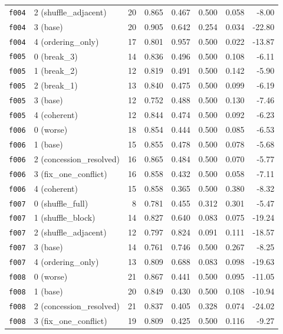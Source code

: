 \documentclass[11pt]{article}
\begin{document}
\begin{table}[htbp]
\begin{tabular}{llrrrrrr}
\texttt{f004} & 2 (shuffle\_adjacent) & 20 & 0.865 & 0.467 & 0.500 & 0.058 & -8.00 \\
\texttt{f004} & 3 (base) & 20 & 0.905 & 0.642 & 0.254 & 0.034 & -22.80 \\
\texttt{f004} & 4 (ordering\_only) & 17 & 0.801 & 0.957 & 0.500 & 0.022 & -13.87 \\
\midrule
\texttt{f005} & 0 (break\_3) & 14 & 0.836 & 0.496 & 0.500 & 0.108 & -6.11 \\
\texttt{f005} & 1 (break\_2) & 12 & 0.819 & 0.491 & 0.500 & 0.142 & -5.90 \\
\texttt{f005} & 2 (break\_1) & 13 & 0.840 & 0.475 & 0.500 & 0.099 & -6.19 \\
\texttt{f005} & 3 (base) & 12 & 0.752 & 0.488 & 0.500 & 0.130 & -7.46 \\
\texttt{f005} & 4 (coherent) & 12 & 0.844 & 0.474 & 0.500 & 0.092 & -6.23 \\
\midrule
\texttt{f006} & 0 (worse) & 18 & 0.854 & 0.444 & 0.500 & 0.085 & -6.53 \\
\texttt{f006} & 1 (base) & 15 & 0.855 & 0.478 & 0.500 & 0.078 & -5.68 \\
\texttt{f006} & 2 (concession\_resolved) & 16 & 0.865 & 0.484 & 0.500 & 0.070 & -5.77 \\
\texttt{f006} & 3 (fix\_one\_conflict) & 16 & 0.858 & 0.432 & 0.500 & 0.058 & -7.11 \\
\texttt{f006} & 4 (coherent) & 15 & 0.858 & 0.365 & 0.500 & 0.380 & -8.32 \\
\midrule
\texttt{f007} & 0 (shuffle\_full) & 8 & 0.781 & 0.455 & 0.312 & 0.301 & -5.47 \\
\texttt{f007} & 1 (shuffle\_block) & 14 & 0.827 & 0.640 & 0.083 & 0.075 & -19.24 \\
\texttt{f007} & 2 (shuffle\_adjacent) & 12 & 0.797 & 0.824 & 0.091 & 0.111 & -18.57 \\
\texttt{f007} & 3 (base) & 14 & 0.761 & 0.746 & 0.500 & 0.267 & -8.25 \\
\texttt{f007} & 4 (ordering\_only) & 13 & 0.809 & 0.688 & 0.083 & 0.098 & -19.63 \\
\midrule
\texttt{f008} & 0 (worse) & 21 & 0.867 & 0.441 & 0.500 & 0.095 & -11.05 \\
\texttt{f008} & 1 (base) & 20 & 0.849 & 0.430 & 0.500 & 0.108 & -10.94 \\
\texttt{f008} & 2 (concession\_resolved) & 21 & 0.837 & 0.405 & 0.328 & 0.074 & -24.02 \\
\texttt{f008} & 3 (fix\_one\_conflict) & 19 & 0.809 & 0.425 & 0.500 & 0.116 & -9.27 \\

\end{tabular}
\end{table}
\end{document}
